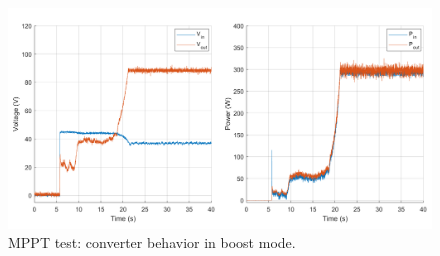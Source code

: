 \begin{figure}[H]
	\begin{center}
		\includegraphics[width=1\textwidth]{../Pictures/P1/Test/Boost_mode_MPPT_Vin_Vout_Iin_Pin_Pout}
		\caption{MPPT test: converter behavior in boost mode.}
		\label{MPPTtestboostmode2}
	\end{center}	
\end{figure}




